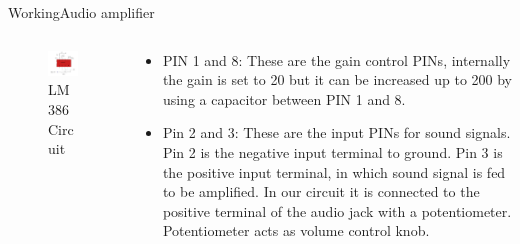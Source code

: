 \documentclass{beamer}
\begin{document}
\begin{frame}{Working}{Audio amplifier}
  \begin{columns}
  \begin{column}{0.32\textwidth}
    \begin{center}
\begin{figure}[htb]
\includegraphics[scale=0.30]{7.png}
\caption{\small{LM 386 Circuit}}
\end{figure}
\end{center} 
 \end{column}
 \begin{column}{0.55\textwidth}
  \begin{itemize}
  \item
PIN 1 and 8: These are the gain control PINs, internally the gain is set to 20 but it can be increased up to 200 by using a capacitor between PIN 1 and 8.
\item
Pin 2 and 3: These are the input PINs for sound signals. Pin 2 is the negative input terminal to ground. Pin 3 is the positive input terminal, in which sound signal is fed to be amplified. In our circuit it is connected to the positive terminal of the audio jack with a  potentiometer. Potentiometer acts as volume control knob.
  \end{itemize}
  \end{column}
  \end{columns}
\end{frame}
\end{document}

